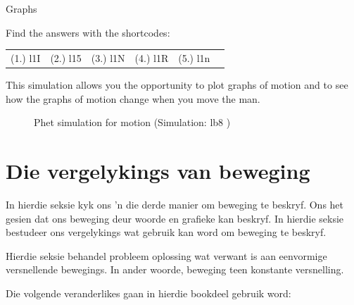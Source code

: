 \begin{exercises}{Graphs }
\par {} Find the answers with the shortcodes:
 \par \begin{tabular}[h]{cccccc}
 (1.) l1I  &  (2.) l15  &  (3.) l1N  &  (4.) l1R  &  (5.) l1n  & \end{tabular}
\end{exercises}
\label{m38795*eip-842}This simulation allows you the opportunity to plot graphs of motion and to see how the graphs of motion change when you move the man.
    \setcounter{subfigure}{0}
	\begin{figure}[H] %
    \textnormal{Phet simulation for motion}\nopagebreak
  \label{m38806*phet!!!underscore!!!sim}\label{m38806*phet-simulation}
             { (Simulation:  lb8 )}
 \end{figure}           \par 
  \label{m38795**end}


\section{Die vergelykings van beweging}
    \nopagebreak
      
In hierdie seksie kyk ons 'n die derde manier om beweging te beskryf. Ons het gesien dat ons beweging deur woorde en grafieke kan beskryf. In hierdie seksie bestudeer ons vergelykings wat gebruik kan word om beweging te beskryf.\par

Hierdie seksie behandel probleem oplossing wat verwant is aan eenvormige versnellende bewegings. In ander woorde, beweging teen konstante versnelling.

Die volgende veranderlikes gaan in hierdie bookdeel gebruik word:\par      
      

